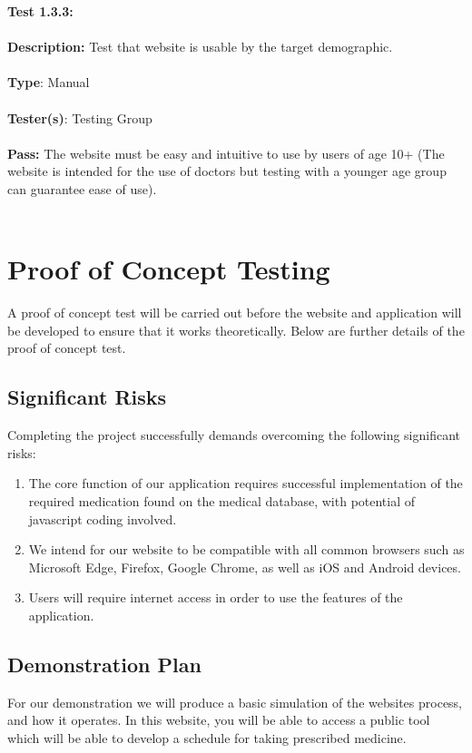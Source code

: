 \documentclass[12pt]{article}
\begin{document}
\begin{tcolorbox}
\textbf{Test 1.3.3:} \\ \\
\textbf{Description:} Test that website is usable by the target demographic. \\ \\
\textbf{Type}: Manual \\ \\
\textbf{Tester(s)}: Testing Group \\ \\
\textbf{Pass:} The website must be easy and intuitive to use by users of age 10+ (The website is intended for the use of doctors but testing with a younger age group can guarantee ease of use). \\ \\
\end{tcolorbox}

\section{Proof of Concept Testing}
A proof of concept test will be carried out before the website and application will be developed to ensure that it works theoretically. Below are further details of the proof of concept test.

\subsection{Significant Risks}
Completing the project successfully demands overcoming the following significant risks:
\begin{enumerate}
\item The core function of our application requires successful implementation of the required medication found on the medical database, with potential of javascript coding involved.
\item We intend for our website to be compatible with all common browsers such as Microsoft Edge, Firefox, Google Chrome, as well as iOS and Android devices.
\item Users will require internet access in order to use the features of the application.
\end{enumerate}

\subsection{Demonstration Plan}
For our demonstration we will produce a basic simulation of the website\textquotesingle s process, and how it operates. In this website, you will be able to access a public tool which will be able to develop a schedule for taking prescribed medicine. 
\end{document}
